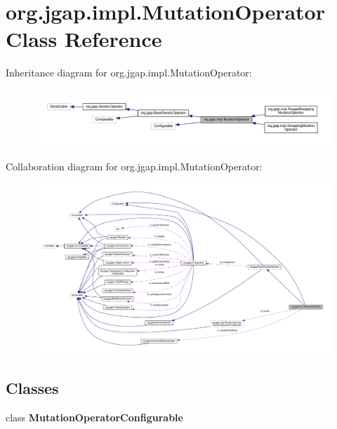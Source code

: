 \hypertarget{classorg_1_1jgap_1_1impl_1_1_mutation_operator}{\section{org.\-jgap.\-impl.\-Mutation\-Operator Class Reference}
\label{classorg_1_1jgap_1_1impl_1_1_mutation_operator}
}


Inheritance diagram for org.\-jgap.\-impl.\-Mutation\-Operator\-:
\nopagebreak
\begin{figure}[H]
\begin{center}
\leavevmode
\includegraphics[width=350pt]{classorg_1_1jgap_1_1impl_1_1_mutation_operator__inherit__graph}
\end{center}
\end{figure}


Collaboration diagram for org.\-jgap.\-impl.\-Mutation\-Operator\-:
\nopagebreak
\begin{figure}[H]
\begin{center}
\leavevmode
\includegraphics[width=350pt]{classorg_1_1jgap_1_1impl_1_1_mutation_operator__coll__graph}
\end{center}
\end{figure}
\subsection*{Classes}
\begin{DoxyCompactItemize}
\item 
class {\bfseries Mutation\-Operator\-Configurable}
\end{DoxyCompactItemize}
